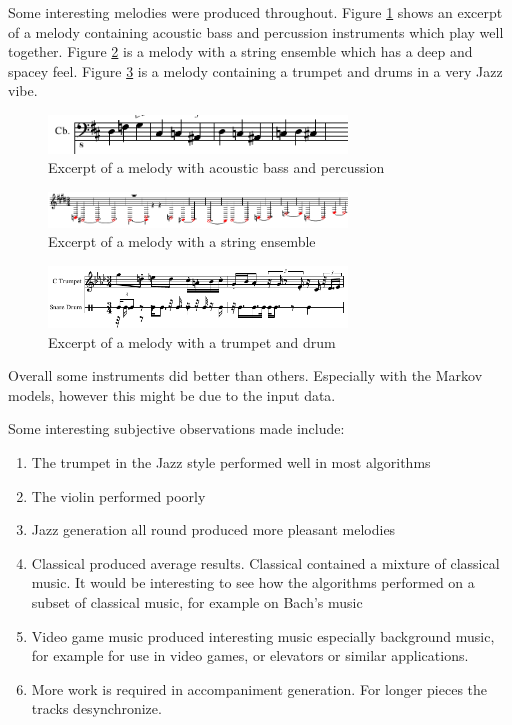 Some interesting melodies were produced throughout. Figure \ref{ims:res_melody_bass_drum} shows an excerpt of a melody containing acoustic bass and percussion instruments which play well together. Figure \ref{ims:res_melody_string_spacey} is a melody with a string ensemble which has a deep and spacey feel. Figure \ref{ims:res_melody_trumpet_drum} is a melody containing a trumpet and drums in a very Jazz vibe.

\begin{figure}
\centerline{\includegraphics[width=300px]{../images/res_melody_bass_drum.pdf}}
\caption{Excerpt of a melody with acoustic bass and percussion}
\label{ims:res_melody_bass_drum}
\end{figure}

\begin{figure}
\centerline{\includegraphics[width=300px]{../images/res_melody_spacey_string.pdf}}
\caption{Excerpt of a melody with a string ensemble}
\label{ims:res_melody_string_spacey}
\end{figure}

\begin{figure}
\centerline{\includegraphics[width=300px]{../images/res_melody_trumpet_drum.pdf}}
\caption{Excerpt of a melody with a trumpet and drum}
\label{ims:res_melody_trumpet_drum}
\end{figure}

Overall some instruments did better than others. Especially with the Markov models, however this might be due to the input data. 

Some interesting subjective observations made include:
\begin{enumerate}
\item The trumpet in the Jazz style performed well in most algorithms
\item The violin performed poorly
\item Jazz generation all round produced more pleasant melodies
\item Classical produced average results. Classical contained a mixture of classical music. It would be interesting to see how the algorithms performed on a subset of classical music, for example on Bach's music
\item Video game music produced interesting music especially background music, for example for use in video games, or elevators or similar applications.
\item More work is required in accompaniment generation. For longer pieces the tracks desynchronize.
\end{enumerate}


